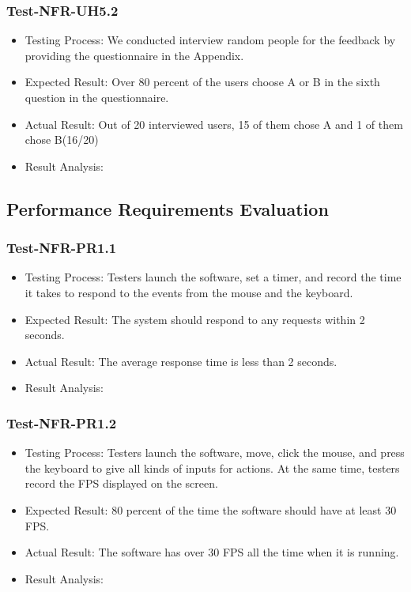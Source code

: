 \documentclass[12pt, titlepage]{article}
\begin{document}
            \subsubsection{Test-NFR-UH5.2}
\begin{itemize}
    \item Testing Process: We conducted interview random people for the feedback by providing the questionnaire in the Appendix.
    \item Expected Result: Over 80 percent of the users choose A or B in the sixth question in the questionnaire.
    \item Actual Result: Out of 20 interviewed users, 15 of them chose A and 1 of them chose B(16/20)
    \item Result Analysis: \pass
\end{itemize}
\subsection{Performance Requirements Evaluation}
\subsubsection{Test-NFR-PR1.1}
\begin{itemize}
    \item Testing Process: Testers launch the software, set a timer, and record the time it takes to respond to the events from the mouse and the keyboard.
    \item Expected Result: The system should respond to any requests within 2 seconds. 
    \item Actual Result: The average response time is less than 2 seconds.
    \item Result Analysis: \pass 
\end{itemize}
\subsubsection{Test-NFR-PR1.2}
\begin{itemize}
    \item Testing Process: Testers launch the software, move, click the mouse, and press the keyboard to give all kinds of inputs for actions. At the same time, testers record the FPS displayed on the screen.
    \item Expected Result: 80 percent of the time the software should have at least 30 FPS.
    \item Actual Result: The software has over 30 FPS all the time when it is running.
    \item Result Analysis: \pass 
\end{itemize}
\end{document}
